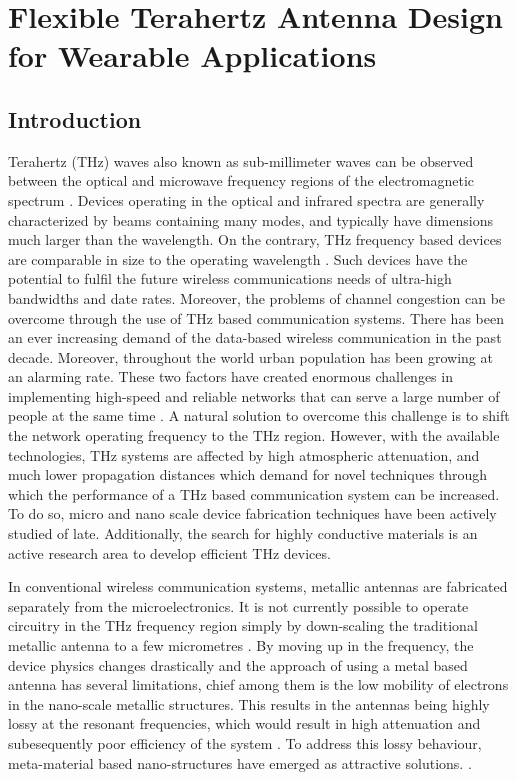 \documentclass[12pt]{suhbook}
\begin{document}
\setcounter{chapter}{3}%
\chapter{Flexible Terahertz Antenna Design for Wearable Applications}
\section{Introduction}
Terahertz (THz) waves also known as sub-millimeter waves can be observed between the optical and microwave frequency regions of the electromagnetic spectrum \cite{liu2009advanced,grischkowsky1990far}. Devices operating in the optical and infrared spectra are generally characterized by beams containing many modes, and typically have dimensions much larger than the wavelength. On the contrary, THz frequency based devices are comparable in size to the operating wavelength \cite{shi2018thz}. Such devices have the potential to fulfil the future wireless communications needs of ultra-high bandwidths and date rates. Moreover, the problems of channel congestion can be overcome through the use of THz based communication systems. 
There has been an ever increasing demand of the data-based wireless communication in the past decade. Moreover, throughout the world urban population has been growing at an alarming rate. These two factors have created enormous challenges in implementing high-speed and reliable networks that can serve a large number of people at the same time \cite{song2011present}. A natural solution to overcome this challenge is to shift the network operating frequency to the THz region. However, with the available technologies, THz systems are affected by high atmospheric attenuation, and much lower propagation distances which demand for novel techniques through which the performance of a THz based communication system can be increased. To do so, micro and nano scale device fabrication techniques have been actively studied of late. Additionally, the search for highly conductive materials is an active research area to develop  efficient THz devices.

In conventional wireless communication systems, metallic antennas are fabricated separately from the microelectronics. It is not currently possible to operate circuitry in the THz frequency region simply by down-scaling the traditional metallic antenna to a few micrometres \cite{kleine2011review}. By moving up in the frequency, the device physics changes drastically and the approach of using a metal based antenna has several limitations, chief among them is the low mobility of electrons in the nano-scale metallic structures. This results in the antennas being highly lossy at the resonant frequencies, which would result in high attenuation and subesequently poor efficiency of the system \cite{pourahmadazar2018millimeter}. To address this lossy behaviour, meta-material based nano-structures have emerged as attractive solutions. \cite{chen2006active}.
% 
% 
% 
\end{document}
